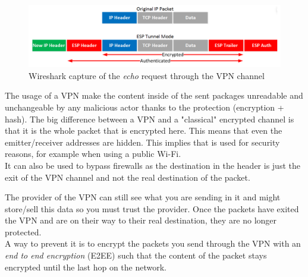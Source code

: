 \documentclass[10pt,a4paper]{ULBreport}
\begin{document}
\begin{figure}[H]
    \centering
    \includegraphics[width=\textwidth]{Images/additionnal_headers_trailers.png}
    \caption{Wireshark capture of the \textit{echo} request through the VPN channel}
    \label{img:IPSec}
\end{figure}



The usage of a VPN make the content inside of the sent packages unreadable and unchangeable by any malicious actor thanks to the protection (encryption + hash). The big difference between a VPN and a "classical" encrypted channel is that it is the whole packet that is encrypted here. This means that even the emitter/receiver addresses are hidden.
This implies that is used for security reasons, for example when using a public Wi-Fi.\\
It can also be used to bypass firewalls as the destination in the header is just the exit of the VPN channel and not
the real destination of the packet.



The provider of the VPN can still see what you are sending in it and might store/sell this data so you must trust the provider. Once the packets have exited the VPN and are on their way to their real destination, they are no longer protected.\\
A way to prevent it is to encrypt the packets you send through the VPN with an \textit{end to end encryption} (E2EE) such that the content of the packet stays encrypted until the last hop on the network.
\end{document}
